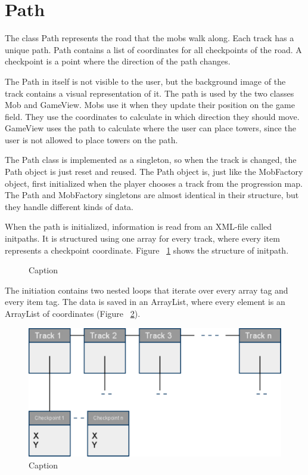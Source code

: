 \section{Path}

The class Path represents the road that the mobs walk along. Each track has a unique path. Path contains a list of coordinates for all checkpoints of the road. A checkpoint is a point where the direction of the path changes. 

The Path in itself is not visible to the user, but the background image of the track contains a visual representation of it. The path is used by the two classes Mob and GameView. Mobs use it when they update their position on the game field. They use the coordinates to calculate in which direction they should move. GameView uses the path to calculate where the user can place towers, since the user is not allowed to place towers on the path.

The Path class is implemented as a singleton, so when the track is changed, the Path object is just reset and reused. The Path object is, just like the MobFactory object, first initialized when the player chooses a track from the progression map. The Path and MobFactory singletons are almost identical in their structure, but they handle different kinds of data.

When the path is initialized, information is read from an XML-file called initpaths. It is structured using one array for every track, where every item represents a checkpoint coordinate. Figure ~\ref{fig:codeExInitPathXML} shows the structure of initpath.

\begin{figure}[htb]

\begin{small}

\end{small}

\caption{Caption}
\label{fig:codeExInitPathXML}

\end{figure}

The initiation contains two nested loops that iterate over every array tag and every item tag. The data is saved in an ArrayList, where every element is an ArrayList of coordinates (Figure  ~\ref{fig:dataStructurePath}).

\begin{figure}[here]

\begin{center}
\includegraphics[scale=0.5]{pics/chapters/chapter4/pathlist2}
\end{center}

\caption{Caption}
\label{fig:dataStructurePath}
\end{figure}
